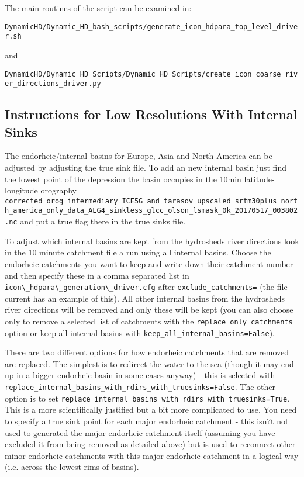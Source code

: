 \documentclass{article}
\begin{document}
The main routines of the script can be examined in:

\lstinline[style=bash_input]{DynamicHD/Dynamic_HD_bash_scripts/generate_icon_hdpara_top_level_driver.sh}

and 

\lstinline[style=bash_input]{DynamicHD/Dynamic_HD_Scripts/Dynamic_HD_Scripts/create_icon_coarse_river_directions_driver.py}


\subsection{Instructions for Low Resolutions With Internal Sinks}

The endorheic/internal basins for Europe, Asia and North America can be adjusted by adjusting the true sink file. To add an new internal basin just find the lowest point of the depression the basin occupies in the 10min latitude-longitude orography \lstinline[style=bash_input]{corrected_orog_intermediary_ICE5G_and_tarasov_upscaled_srtm30plus_north_america_only_data_ALG4_sinkless_glcc_olson_lsmask_0k_20170517_003802.nc} and put a true flag there in the true sinks file.

To adjust which internal basins are kept from the hydrosheds river directions look in the 10 minute catchment file a run using all internal basins.  Choose the endorheic  catchments you want to keep and write down their catchment number and then specify these in a comma separated list in \lstinline[style=bash_input]{icon\_hdpara\_generation\_driver.cfg} after \lstinline[style=bash_input]{exclude_catchments=} (the file current has an example of this). All other internal basins from the hydrosheds river directions will be removed and only these will be kept (you can also choose only to remove a selected list of catchments with the \lstinline[style=bash_input]{replace_only_catchments} option or keep all internal basins with \lstinline[style=bash_input]{keep_all_internal_basins=False}).  

There are two different options for how endorheic catchments that are removed are replaced. The simplest is to redirect the water to the sea (though it may end up in a bigger endorheic basin in some cases anyway) - this is selected with \lstinline[style=bash_input]{replace_internal_basins_with_rdirs_with_truesinks=False}. The other option is to set \lstinline[style=bash_input]{replace_internal_basins_with_rdirs_with_truesinks=True}. This is a more scientifically justified but a bit more complicated to use. You need to specify a true sink point for each major endorheic catchment - this isn?t not used to generated the major endorheic catchment itself (assuming you have excluded it from being removed as detailed above) but is used to reconnect other minor endorheic catchments with this major endorheic catchment in a logical way (i.e. across the lowest rims of basins). 
\end{document}
